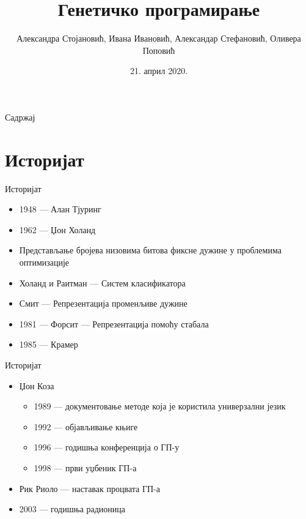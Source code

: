 \documentclass{beamer}
\title[Генетичко програмирање]{Генетичко програмирање}
\author[Стојановић, Ивановић, Стефановић, Поповић]{Александра Стојановић, Ивана Ивановић, Александар Стефановић, Оливера Поповић}
\institute[МАТФ]{Математички факултет\\Универзитет у Београду}
\date{21. април 2020.}
\begin{document}
\begin{frame}
  \titlepage
\end{frame}

\begin{frame}{Садржај}
  \tableofcontents
\end{frame}

\section{Историјат}

    \begin{frame}{Историјат}
        \begin{itemize}
            \item 1948 — Алан Тјуринг
            \item 1962 — Џон Холанд
            \item Представљање бројева низовима битова фиксне дужине у проблемима оптимизације
            \item Холанд и Раитман — Систем класификатора
            \item Смит — Репрезентација променљиве дужине
            \item 1981 — Форсит — Репрезентација помоћу стабала
            \item 1985 — Крамер
        \end{itemize}
    \end{frame}

    \begin{frame}{Историјат}
        \begin{itemize}
            \item Џон Коза
            \begin{itemize}
                \item 1989 — документовање методе која је користила универзални језик
                \item 1992 — објављивање књиге
                \item 1996 — годишња конференција о ГП-у
                \item 1998 — први уџбеник ГП-а
            \end{itemize}
            \item Рик Риоло — наставак процвата ГП-а
            \item 2003 — годишња радионица
        \end{itemize}
    \end{frame}
\end{document}
